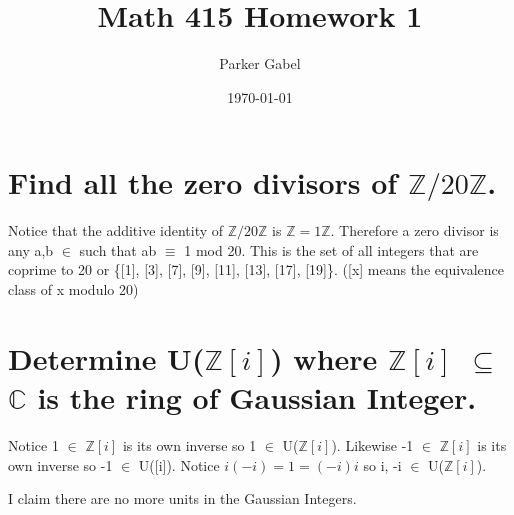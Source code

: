 \documentclass[11pt]{article}
\author{Parker Gabel}
\date{\today}
\title{Math 415 Homework 1}
\begin{document}
\maketitle

\section{Find all the zero divisors of \(\mathbb{Z}/20\mathbb{Z}\).}
\label{sec:orgabf08a1}
Notice that the additive identity of \(\mathbb{Z}/20\mathbb{Z}\) is \(\mathbb{Z} = 1 \mathbb{Z}\). 
Therefore a zero divisor is any a,b \(\in\)  such that ab \(\equiv\) 1 mod 20. This is the set of all integers that are coprime to 20 or \{[1], [3], [7], [9], [11], [13], [17], [19]\}. ([x] means the equivalence class of x modulo 20)

\section{Determine U(\(\mathbb{Z}[i]\)) where \(\mathbb{Z}[i]\) \(\subseteq\) \(\mathbb{C}\) is the ring of Gaussian Integer.}
\label{sec:orga53783b}
Notice 1 \(\in\) \(\mathbb{Z}[i]\) is its own inverse so 1 \(\in\) U(\(\mathbb{Z}[i]\)). Likewise -1 \(\in\) \(\mathbb{Z}[i]\) is its own inverse so -1 \(\in\) U([i]).
Notice \(i(-i) = 1 = (-i)i\) so i, -i \(\in\) U(\(\mathbb{Z}[i]\)). \par 
I claim there are no more units in the Gaussian Integers.
\end{document}

